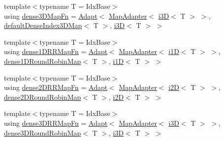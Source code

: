 \begin{DoxyCompactItemize}
\item 
{\footnotesize template$<$typename T  = Idx\+Base$>$ }\\using \hyperlink{namespacevt_1_1mapping_a4161eb1a3c61249a269654c4529788e0}{dense3\+D\+Map\+Fn} = \hyperlink{namespacevt_1_1mapping_aafe187035ce8df02f31983e37cdb6a5d}{Adapt}$<$ \hyperlink{namespacevt_1_1mapping_a41b113c28bb6430fbcb5be66e08ccf9f}{Map\+Adapter}$<$ \hyperlink{namespacevt_1_1mapping_af435b967b9ed1ccb5ec4effdbd9abd13}{i3D}$<$ T $>$ $>$, \hyperlink{namespacevt_1_1mapping_a776a69138a1fbceab5bbf10b9c07a858}{default\+Dense\+Index3\+D\+Map}$<$ T $>$, \hyperlink{namespacevt_1_1mapping_af435b967b9ed1ccb5ec4effdbd9abd13}{i3D}$<$ T $>$ $>$
\item 
{\footnotesize template$<$typename T  = Idx\+Base$>$ }\\using \hyperlink{namespacevt_1_1mapping_a35647c2efdfa50549574fcbd05132dc0}{dense1\+D\+R\+R\+Map\+Fn} = \hyperlink{namespacevt_1_1mapping_aafe187035ce8df02f31983e37cdb6a5d}{Adapt}$<$ \hyperlink{namespacevt_1_1mapping_a41b113c28bb6430fbcb5be66e08ccf9f}{Map\+Adapter}$<$ \hyperlink{namespacevt_1_1mapping_af0c14a9a77e0311b3d089143ed93ba76}{i1D}$<$ T $>$ $>$, \hyperlink{namespacevt_1_1mapping_a2a4e62c5dc17da0032d3953c7e3cde8b}{dense1\+D\+Round\+Robin\+Map}$<$ T $>$, \hyperlink{namespacevt_1_1mapping_af0c14a9a77e0311b3d089143ed93ba76}{i1D}$<$ T $>$ $>$
\item 
{\footnotesize template$<$typename T  = Idx\+Base$>$ }\\using \hyperlink{namespacevt_1_1mapping_a7a86c7f1af7a323cd67e97e8897804e4}{dense2\+D\+R\+R\+Map\+Fn} = \hyperlink{namespacevt_1_1mapping_aafe187035ce8df02f31983e37cdb6a5d}{Adapt}$<$ \hyperlink{namespacevt_1_1mapping_a41b113c28bb6430fbcb5be66e08ccf9f}{Map\+Adapter}$<$ \hyperlink{namespacevt_1_1mapping_a6448c875e0807b43f31e96fc5b0cec04}{i2D}$<$ T $>$ $>$, \hyperlink{namespacevt_1_1mapping_ac606a5886c93a4dbb05dfead285c30c6}{dense2\+D\+Round\+Robin\+Map}$<$ T $>$, \hyperlink{namespacevt_1_1mapping_a6448c875e0807b43f31e96fc5b0cec04}{i2D}$<$ T $>$ $>$
\item 
{\footnotesize template$<$typename T  = Idx\+Base$>$ }\\using \hyperlink{namespacevt_1_1mapping_adb1f9b4ca3e67e3b47ca1a562f656217}{dense3\+D\+R\+R\+Map\+Fn} = \hyperlink{namespacevt_1_1mapping_aafe187035ce8df02f31983e37cdb6a5d}{Adapt}$<$ \hyperlink{namespacevt_1_1mapping_a41b113c28bb6430fbcb5be66e08ccf9f}{Map\+Adapter}$<$ \hyperlink{namespacevt_1_1mapping_af435b967b9ed1ccb5ec4effdbd9abd13}{i3D}$<$ T $>$ $>$, \hyperlink{namespacevt_1_1mapping_aa48fa3b830b637787c584dbac5bba6db}{dense3\+D\+Round\+Robin\+Map}$<$ T $>$, \hyperlink{namespacevt_1_1mapping_af435b967b9ed1ccb5ec4effdbd9abd13}{i3D}$<$ T $>$ $>$

\end{DoxyCompactItemize}
